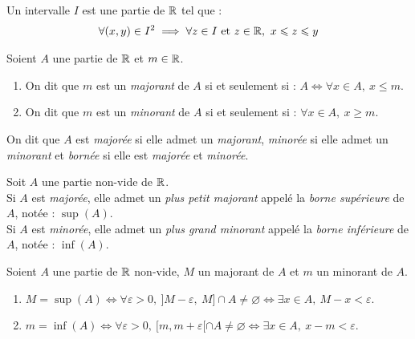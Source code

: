 \begin{definition}[Intervalle]
    Un intervalle $I$ est une partie de $\mathbb{R}$ tel que :
    \begin{align*}
        \forall (x, y) \in I^2 \implies \forall z \in I \text{ et } z \in \mathbb{R},\ x \leqslant z \leqslant y
    \end{align*}
\end{definition}

\begin{definition}
    Soient $A$ une partie de $\mathbb{R}$ et $m \in \mathbb{R}$.
    \begin{enumerate}
        \item On dit que $m$ est un \emph{majorant} de $A$ si et seulement si : $A \iff \forall x \in A,\ x \leq m$.
        \item On dit que $m$ est un \emph{minorant} de $A$ si et seulement si : $\forall x \in A,\ x \geq m$.
    \end{enumerate}
    On dit que $A$ est \emph{majorée} si elle admet un \emph{majorant}, \emph{minorée} si elle admet un \emph{minorant} et \emph{bornée} si elle est \emph{majorée} et \emph{minorée}.
\end{definition}

\begin{theorem}
    Soit $A$ une partie non-vide de $\mathbb{R}$. \\
    Si $A$ est \emph{majorée}, elle admet un \emph{plus petit majorant} appelé la \emph{borne supérieure} de $A$, notée : $\sup(A)$.
    \\
    Si $A$ est \emph{minorée}, elle admet un \emph{plus grand minorant} appelé la \emph{borne inférieure} de $A$, notée : $\inf(A)$.
\end{theorem}

\begin{proposition}
    Soient $A$ une partie de $\mathbb{R}$ non-vide, $M$ un majorant de $A$ et $m$ un minorant de $A$.  
    \begin{enumerate}
        \item $M = \sup(A) \iff \forall \varepsilon > 0,\ ]M - \varepsilon,\ M] \cap A \neq \varnothing \iff \exists x \in A,\ M - x < \varepsilon$.
        \item $m = \inf(A) \iff \forall \varepsilon > 0,\ [m, m + \varepsilon[ \cap A \neq \varnothing \iff \exists x \in A,\ x - m < \varepsilon$.
    \end{enumerate}
\end{proposition}